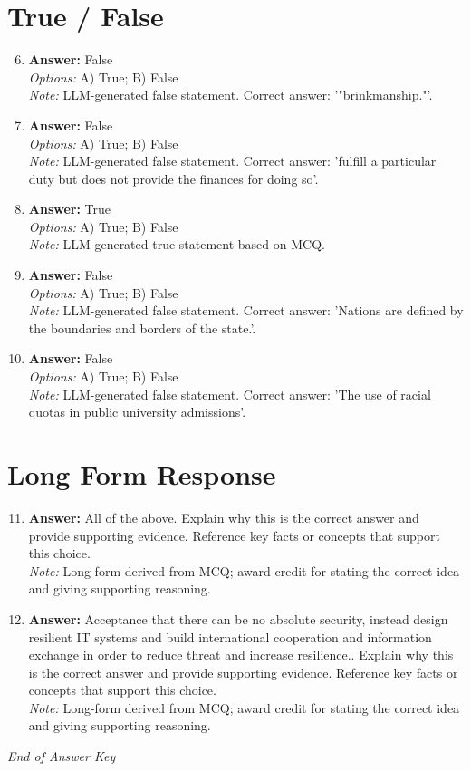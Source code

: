 \documentclass[12pt]{article}
\begin{document}
\section*{True / False}
\begin{enumerate}[label=\arabic*.]
\setcounter{enumi}{5}
\item \textbf{Answer:} False
\\ \textit{Options:} A) True; B) False
\\ \textit{Note:} LLM-generated false statement. Correct answer: '"brinkmanship."'.
\item \textbf{Answer:} False
\\ \textit{Options:} A) True; B) False
\\ \textit{Note:} LLM-generated false statement. Correct answer: 'fulfill a particular duty but does not provide the finances for doing so'.
\item \textbf{Answer:} True
\\ \textit{Options:} A) True; B) False
\\ \textit{Note:} LLM-generated true statement based on MCQ.
\item \textbf{Answer:} False
\\ \textit{Options:} A) True; B) False
\\ \textit{Note:} LLM-generated false statement. Correct answer: 'Nations are defined by the boundaries and borders of the state.'.
\item \textbf{Answer:} False
\\ \textit{Options:} A) True; B) False
\\ \textit{Note:} LLM-generated false statement. Correct answer: 'The use of racial quotas in public university admissions'.
\end{enumerate}

\section*{Long Form Response}
\begin{enumerate}[label=\arabic*.]
\setcounter{enumi}{10}
\item \textbf{Answer:} All of the above. Explain why this is the correct answer and provide supporting evidence. Reference key facts or concepts that support this choice.
\\ \textit{Note:} Long-form derived from MCQ; award credit for stating the correct idea and giving supporting reasoning.
\item \textbf{Answer:} Acceptance that there can be no absolute security, instead design resilient IT systems and build international cooperation and information exchange in order to reduce threat and increase resilience.. Explain why this is the correct answer and provide supporting evidence. Reference key facts or concepts that support this choice.
\\ \textit{Note:} Long-form derived from MCQ; award credit for stating the correct idea and giving supporting reasoning.
\end{enumerate}

\vfill
\noindent\textit{End of Answer Key}
\end{document}
